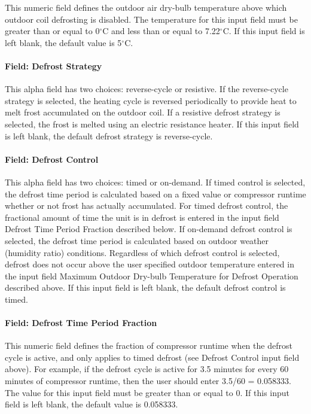 This numeric field defines the outdoor air dry-bulb temperature above which outdoor coil defrosting is disabled. The temperature for this input field must be greater than or equal to 0$^\circ$C and less than or equal to 7.22$^\circ$C. If this input field is left blank, the default value is 5$^\circ$C.

\paragraph{Field: Defrost Strategy}\label{field-defrost-strategy-1}

This alpha field has two choices: reverse-cycle or resistive. If the reverse-cycle strategy is selected, the heating cycle is reversed periodically to provide heat to melt frost accumulated on the outdoor coil. If a resistive defrost strategy is selected, the frost is melted using an electric resistance heater. If this input field is left blank, the default defrost strategy is reverse-cycle.

\paragraph{Field: Defrost Control}\label{field-defrost-control-1}

This alpha field has two choices: timed or on-demand. If timed control is selected, the defrost time period is calculated based on a fixed value or compressor runtime whether or not frost has actually accumulated. For timed defrost control, the fractional amount of time the unit is in defrost is entered in the input field Defrost Time Period Fraction described below. If on-demand defrost control is selected, the defrost time period is calculated based on outdoor weather (humidity ratio) conditions. Regardless of which defrost control is selected, defrost does not occur above the user specified outdoor temperature entered in the input field Maximum Outdoor Dry-bulb Temperature for Defrost Operation described above. If this input field is left blank, the default defrost control is timed.

\paragraph{Field: Defrost Time Period Fraction}\label{field-defrost-time-period-fraction-1}

This numeric field defines the fraction of compressor runtime when the defrost cycle is active, and only applies to timed defrost (see Defrost Control input field above). For example, if the defrost cycle is active for 3.5 minutes for every 60 minutes of compressor runtime, then the user should enter 3.5/60 = 0.058333. The value for this input field must be greater than or equal to 0. If this input field is left blank, the default value is 0.058333.

